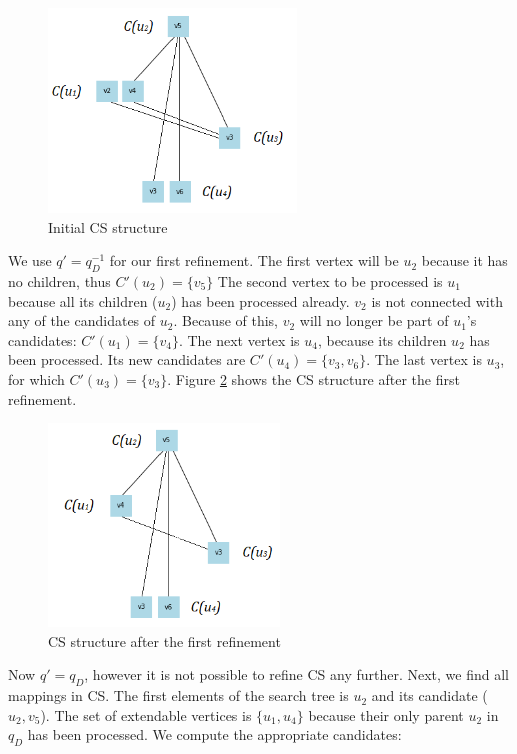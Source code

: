 \begin{example}
    \begin{figure}[h!]
        \centering
        \includegraphics{figures/initcs.png}
        \caption{Initial CS structure}
        \label{fig:dafinitcs}
    \end{figure}

    We use $q' = q^{-1}_D$ for our first refinement. The first vertex will be $u_2$ because it has no children, thus $C'(u_2) = \{v_5\}$
    The second vertex to be processed is $u_1$ because all its children ($u_2$) has been processed already. $v_2$ is not connected with
    any of the candidates of $u_2$. Because of this, $v_2$ will no longer be part of $u_1$'s candidates: $C'(u_1) = \{v_4\}$. The next
    vertex is $u_4$, because its children $u_2$ has been processed. Its new candidates are $C'(u_4) = \{v_3, v_6\}$. The last vertex is
    $u_3$, for which $C'(u_3) = \{v_3\}$. Figure \ref{fig:dafrefcs} shows the CS structure after the first refinement.

    \begin{figure}[h!]
        \centering
        \includegraphics{figures/refinedcs.png}
        \caption{CS structure after the first refinement}
        \label{fig:dafrefcs}
    \end{figure}

    Now $q' = q_D$, however it is not possible to refine CS any further. Next, we find all mappings in CS. The first elements of the 
    search tree is $u_2$ and its candidate ($u_2, v_5$). The set of extendable vertices is $\{u_1, u_4\}$ because their only parent
    $u_2$ in $q_D$ has been processed. We compute the appropriate candidates:


\end{example}
